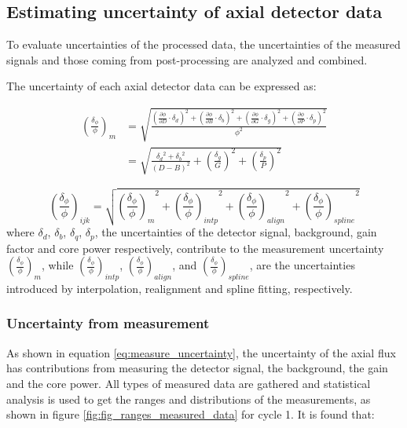 \documentclass{article}
\begin{document}
\subsection{Estimating uncertainty of axial detector data}

To evaluate uncertainties of the processed data, the uncertainties of the measured signals and those coming from post-processing are analyzed and combined.

The uncertainty of each axial detector data can be expressed as:

\begin{equation}
\begin{split}
\label{eq:measure_uncertainty}
  \left(\frac{\delta_\phi}{\phi} \right)_m & = \sqrt{\frac{\left(\frac{\partial \phi}{\partial D}\cdot \delta_d\right)^{2}+\left(\frac{\partial \phi}{\partial B}\cdot \delta_b\right)^{2}+\left(\frac{\partial \phi}{\partial G}\cdot \delta_g\right)^{2}+\left(\frac{\partial \phi}{\partial P}\cdot \delta_p\right)^{2}}{\phi^{2}}} \\
  &=\sqrt{\frac{{\delta_d}^{2}+{\delta_b}^{2}}{(D-B)^{2}}+\left(\frac{\delta_g}{G}\right)^{2}+\left(\frac{\delta_p}{P}\right)^{2}}
\end{split}
\end{equation}

\begin{equation}
\label{eq:combined_uncertainty}
  \left(\frac{\delta_\phi}{\phi} \right)_{ijk} = \sqrt{{\left(\frac{\delta_\phi}{\phi} \right)_m}^{2}+{\left(\frac{\delta_\phi}{\phi}\right)_{intp}}^{2}+{\left(\frac{\delta_\phi}{\phi}\right)_{align}}^{2}+{\left(\frac{\delta_\phi}{\phi}\right)_{spline}}^{2}}
\end{equation}
where $\delta_{d}$, $\delta_{b}$, $\delta_{q}$, $\delta_{p}$, the uncertainties of the detector signal, background, gain factor and core power respectively, contribute to the measurement uncertainty $\left(\frac{\delta_\phi}{\phi}\right)_m$, while $\left(\frac{\delta_\phi}{\phi}\right)_{intp}$,  $\left(\frac{\delta_\phi}{\phi}\right)_{align}$, and  $\left(\frac{\delta_\phi}{\phi}\right)_{spline}$,  are the uncertainties introduced by interpolation, realignment and spline fitting, respectively. 

\subsubsection{Uncertainty from measurement}
As shown in equation \ref{eq:measure_uncertainty}, the uncertainty of the axial flux has contributions from measuring the detector signal, the background, the gain and the core power. All types of measured data are gathered and statistical analysis is used to get the ranges and distributions of the measurements, as shown in figure \ref{fig:fig_ranges_measured_data} for cycle 1. It is found that:
\end{document}
